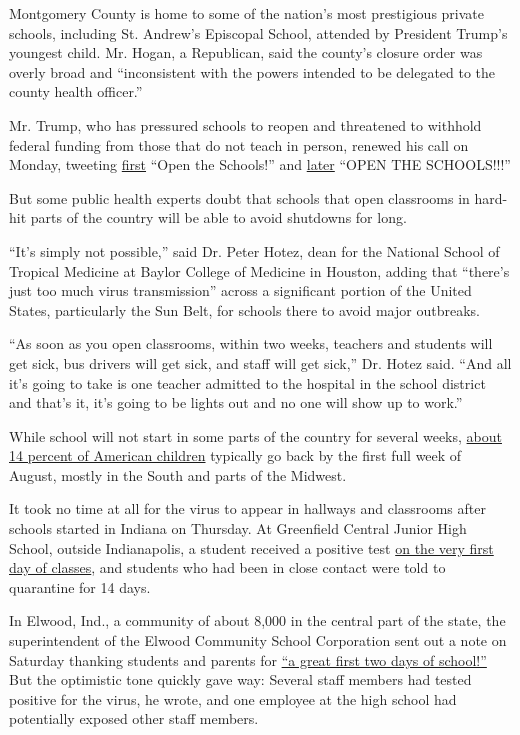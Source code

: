 Montgomery County is home to some of the nation's most prestigious
private schools, including St. Andrew's Episcopal School, attended by
President Trump's youngest child. Mr. Hogan, a Republican, said the
county's closure order was overly broad and ``inconsistent with the
powers intended to be delegated to the county health officer.''

Mr. Trump, who has pressured schools to reopen and threatened to
withhold federal funding from those that do not teach in person, renewed
his call on Monday, tweeting
\href{https://twitter.com/realDonaldTrump/status/1290257055534551043}{first}
``Open the Schools!'' and
\href{https://twitter.com/realDonaldTrump/status/1290488364362170371}{later}
``OPEN THE SCHOOLS!!!''

But some public health experts doubt that schools that open classrooms
in hard-hit parts of the country will be able to avoid shutdowns for
long.

``It's simply not possible,'' said Dr. Peter Hotez, dean for the
National School of Tropical Medicine at Baylor College of Medicine in
Houston, adding that ``there's just too much virus transmission'' across
a significant portion of the United States, particularly the Sun Belt,
for schools there to avoid major outbreaks.

``As soon as you open classrooms, within two weeks, teachers and
students will get sick, bus drivers will get sick, and staff will get
sick,'' Dr. Hotez said. ``And all it's going to take is one teacher
admitted to the hospital in the school district and that's it, it's
going to be lights out and no one will show up to work.''

While school will not start in some parts of the country for several
weeks,
\href{https://www.pewresearch.org/fact-tank/2019/08/14/back-to-school-dates-u-s/}{about
14 percent of American children} typically go back by the first full
week of August, mostly in the South and parts of the Midwest.

It took no time at all for the virus to appear in hallways and
classrooms after schools started in Indiana on Thursday. At Greenfield
Central Junior High School, outside Indianapolis, a student received a
positive test
\href{https://www.nytimes.com/2020/08/01/us/schools-reopening-indiana-coronavirus.html}{on
the very first day of classes}, and students who had been in close
contact were told to quarantine for 14 days.

In Elwood, Ind., a community of about 8,000 in the central part of the
state, the superintendent of the Elwood Community School Corporation
sent out a note on Saturday thanking students and parents for
\href{https://www.facebook.com/ElwoodCommunitySchools/photos/pcb.1875944365880857/1875944205880873/?type=3\&theater}{``a
great first two days of school!''} But the optimistic tone quickly gave
way: Several staff members had tested positive for the virus, he wrote,
and one employee at the high school had potentially exposed other staff
members.

